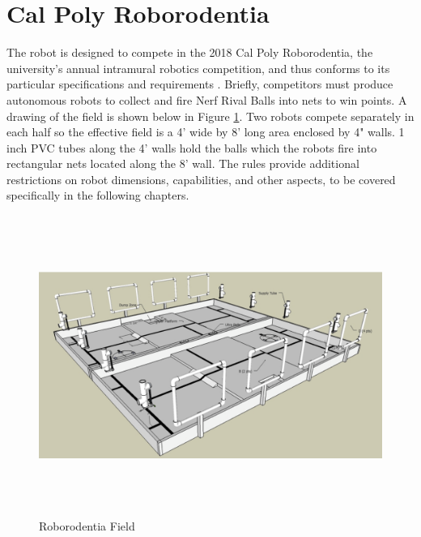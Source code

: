 \section{Cal Poly Roborodentia}
The robot is designed to compete in the 2018 Cal Poly Roborodentia, the university's annual intramural robotics competition, and thus conforms to its particular specifications and requirements \cite{roborodentia}. Briefly, competitors must produce autonomous robots to collect and fire Nerf Rival Balls into nets to win points. A drawing of the field is shown below in Figure \ref{fig:roborodentia_field}. Two robots compete separately in each half so the effective field is a 4' wide by 8' long area enclosed by 4" walls. 1 inch PVC tubes along the 4' walls hold the balls which the robots fire into rectangular nets located along the 8' wall. The rules provide additional restrictions on robot dimensions, capabilities, and other aspects, to be covered specifically in the following chapters.

\begin{figure}[H]   %
	\centering \includegraphics[width=6in, height=3.85in, keepaspectratio]{figures/roborodentia_field.png}
	\caption{Roborodentia Field \cite{roborodentia}}	\label{fig:roborodentia_field}
\end{figure}



